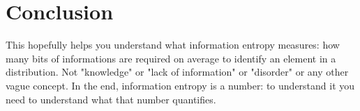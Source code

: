 \documentclass[aps,pra,10pt,floatfix,nofootinbib]{revtex4-1}
\theoremstyle{definition}
\begin{document}
\section{Conclusion}

This hopefully helps you understand what information entropy measures: how many bits of informations are required on average to identify an element in a distribution. Not "knowledge" or "lack of information" or "disorder" or any other vague concept. In the end, information entropy is a number: to understand it you need to understand what that number quantifies.
\end{document}
